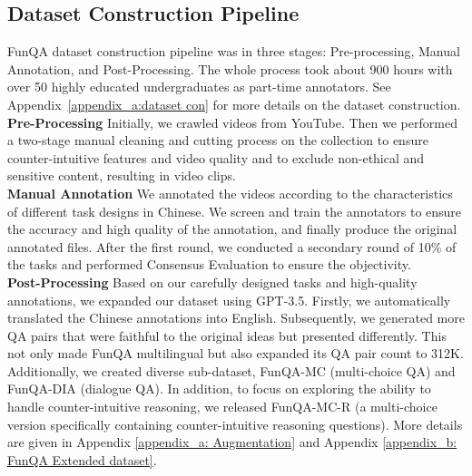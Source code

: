 \subsection{Dataset Construction Pipeline} 
\label{Section: dataset construction pipeline}
FunQA dataset construction pipeline was in three stages: Pre-processing, Manual Annotation, and Post-Processing. The whole process took about 900 hours with over 50 highly educated undergraduates as part-time annotators. See Appendix~\ref{appendix_a:dataset con} for more details on the dataset construction.\\
\noindent\textbf{Pre-Processing}\quad
Initially, we crawled videos from YouTube. Then we performed a two-stage manual cleaning and cutting process on the collection to ensure counter-intuitive features and video quality and to exclude non-ethical and sensitive content, resulting in video clips.\\
\noindent\textbf{Manual Annotation}\quad
We annotated the videos according to the characteristics of different task designs in Chinese. We screen and train the annotators to ensure the accuracy and high quality of the annotation, and finally produce the original annotated files. After the first round, we conducted a secondary round of 10\% of the tasks and performed Consensus Evaluation to ensure the objectivity.\\
\noindent\textbf{Post-Processing}\quad 
Based on our carefully designed tasks and high-quality annotations, we expanded our dataset using GPT-3.5. Firstly, we automatically translated the Chinese annotations into English. Subsequently, we generated more QA pairs that were faithful to the original ideas but presented differently. This not only made FunQA multilingual but also expanded its QA pair count to 312K. Additionally, we created diverse sub-dataset, FunQA-MC (multi-choice QA) and FunQA-DIA (dialogue QA). In addition, to focus on exploring the ability to handle counter-intuitive reasoning, we released FunQA-MC-R (a multi-choice version specifically containing counter-intuitive reasoning questions). More details are given in Appendix \ref{appendix_a: Augmentation} and Appendix \ref{appendix_b: FunQA Extended dataset}.

